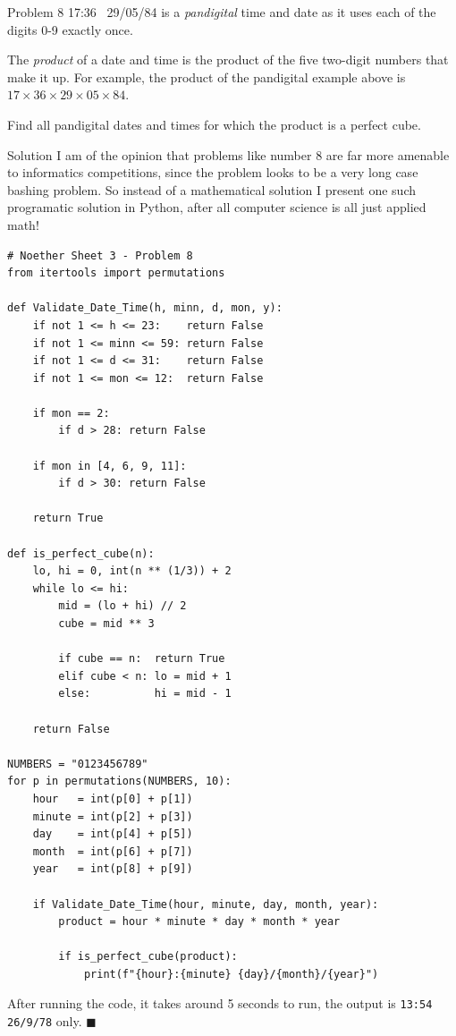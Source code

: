 \documentclass{article}
\begin{document}
\begin{problem}{Problem 8}
17:36 \ 29/05/84 is a \textit{pandigital} time and date as it uses each of
the digits 0-9 exactly once.\vspace{0.2cm}

The \textit{product} of a date and time is the product of the five
two-digit numbers that make it up. For example, the product of the
pandigital example above is $17 \times 36 \times 29 \times 05 \times 84$.
\vspace{0.2cm}

Find all pandigital dates and times for which the product is a perfect cube.
\end{problem}

\begin{solution}{Solution}
I am of the opinion that problems like number 8 are far more amenable to
informatics competitions, since the problem looks to be a very long case
bashing problem. So instead of a mathematical solution I present one such
programatic solution in Python, after all computer science is all just
applied math!


\begin{verbatim}
# Noether Sheet 3 - Problem 8
from itertools import permutations

def Validate_Date_Time(h, minn, d, mon, y):
    if not 1 <= h <= 23:    return False
    if not 1 <= minn <= 59: return False
    if not 1 <= d <= 31:    return False
    if not 1 <= mon <= 12:  return False

    if mon == 2:
        if d > 28: return False

    if mon in [4, 6, 9, 11]:
        if d > 30: return False

    return True

def is_perfect_cube(n):
    lo, hi = 0, int(n ** (1/3)) + 2
    while lo <= hi:
        mid = (lo + hi) // 2
        cube = mid ** 3

        if cube == n:  return True
        elif cube < n: lo = mid + 1
        else:          hi = mid - 1

    return False

NUMBERS = "0123456789"
for p in permutations(NUMBERS, 10):
    hour   = int(p[0] + p[1])
    minute = int(p[2] + p[3])
    day    = int(p[4] + p[5])
    month  = int(p[6] + p[7])
    year   = int(p[8] + p[9])

    if Validate_Date_Time(hour, minute, day, month, year):
        product = hour * minute * day * month * year

        if is_perfect_cube(product):
            print(f"{hour}:{minute} {day}/{month}/{year}")
\end{verbatim}

After running the code, it takes around 5 seconds to run, the output is
\texttt{13:54 26/9/78} only. $\blacksquare$
\end{solution}
\end{document}

